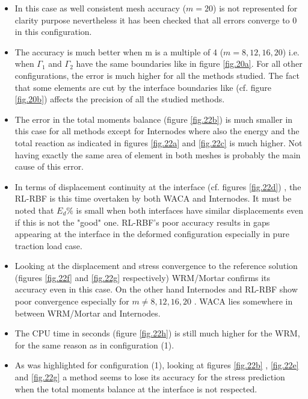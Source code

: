     \begin{itemize}
        \item In this case as well consistent mesh accuracy ($m=20$) is not represented for clarity purpose nevertheless it has been checked that all errors converge to 0 in this configuration.
        \item The accuracy is much better when m is a multiple of 4 ($m=8,12,16,20$) i.e. when $\Gamma_1$ and $\Gamma_2$ have the same boundaries like in figure \ref{fig.20a}. For all other configurations, the error is much higher for all the methods studied. The fact that some elements are cut by the interface boundaries like (cf. figure \ref{fig.20b}) affects the precision of all the studied methods.
        \item The error in the total moments balance (figure \ref{fig.22b}) is much smaller in this case for all methods except for Internodes where also the energy and the total reaction as indicated in figures \ref{fig.22a} and \ref{fig.22c} is much higher. Not having exactly the same area of element in both meshes is probably the main cause of this error. 
        \item In terms of displacement continuity at the interface (cf. figures \ref{fig.22d}) , the RL-RBF is this time overtaken by both WACA and Internodes. It must be noted that $E_{d} \%$ is small when both interfaces have similar displacements even if this is not the "good" one. RL-RBF's poor accuracy results in gaps appearing at the interface in the deformed configuration especially in pure traction load case. 
        \item Looking at the displacement and stress convergence to the reference solution (figures \ref{fig.22f} and \ref{fig.22g} respectively) WRM/Mortar confirms its accuracy even in this case. On the other hand Internodes and RL-RBF show poor convergence especially for $m\neq 8,12,16,20$ . WACA lies somewhere in between WRM/Mortar and Internodes. 
        \item The CPU time in seconds (figure \ref{fig.22h}) is still much higher for the WRM, for the same reason as in configuration (1).
        \item As was highlighted for configuration (1), looking at figures \ref{fig.22b} , \ref{fig.22e} and \ref{fig.22g} a method seems to lose its accuracy for the stress prediction when the total moments balance at the interface is not respected.
    \end{itemize}
 
